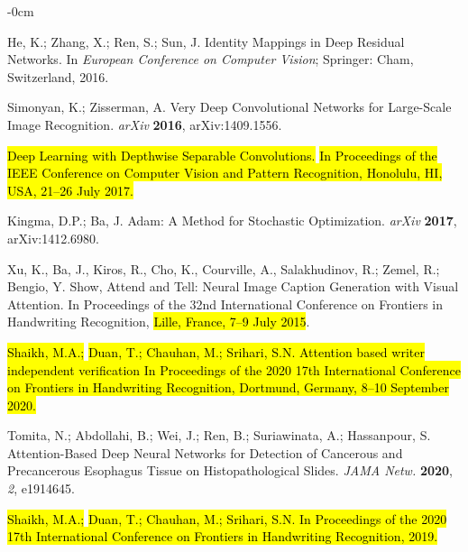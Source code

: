 \documentclass[sensors,article,accept,pdftex,moreauthors]{Definitions/mdpi}
\begin{document}
\begin{adjustwidth}{-\extralength}{0cm}
\begin{thebibliography}{999}
He, K.; Zhang, X.; Ren, S.; Sun, J. Identity Mappings in Deep Residual Networks.
In \emph{European Conference on Computer Vision}; Springer: Cham, Switzerland,
{2016}.

Simonyan, K.; Zisserman, A. Very Deep Convolutional Networks for Large-Scale Image Recognition.
{\em arXiv} 
{\bf 2016}, arXiv:1409.1556.

 \hl{Deep Learning with Depthwise Separable Convolutions.}
\hl{In Proceedings of the IEEE Conference on Computer Vision and Pattern Recognition,  Honolulu, HI, USA, 21--26 July 2017.}

Kingma, D.P.; Ba, J. Adam: A Method for Stochastic Optimization.
{\em arXiv} 
{\bf 2017}, arXiv:1412.6980.

Xu, K., Ba, J., Kiros, R., Cho, K., Courville, A., Salakhudinov, R.; Zemel, R.; Bengio, Y. Show, Attend and Tell: Neural Image Caption Generation with Visual Attention. In Proceedings of the 32nd  {International Conference on Frontiers in Handwriting Recognition, \hl{Lille, France, 7--9 July 2015}}.

\hl{Shaikh, M.A.;} %
 \hl{Duan, T.; Chauhan, M.; Srihari, S.N. Attention based writer independent verification In Proceedings of the 2020 17th International Conference on Frontiers in Handwriting Recognition,  Dortmund, Germany, 8--10 September
2020.}

Tomita, N.; Abdollahi, B.; Wei, J.; Ren, B.; Suriawinata, A.; Hassanpour, S. Attention-Based Deep Neural Networks for Detection of Cancerous and Precancerous Esophagus Tissue on Histopathological Slides.
{\em JAMA Netw.} 
{\bf 2020}, \emph{2}, e1914645.

\hl{Shaikh, M.A.;} %
 \hl{Duan, T.; Chauhan, M.; Srihari, S.N. In Proceedings of the 2020 17th International Conference on Frontiers in Handwriting Recognition,
2019.}


\end{thebibliography}
\end{adjustwidth}
\end{document}
